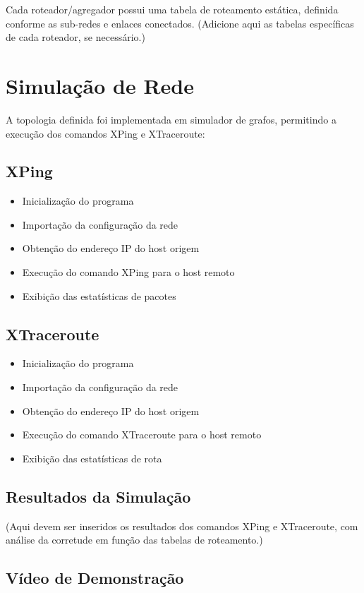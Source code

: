 \documentclass[conference,compsoc]{IEEEtran}
\begin{document}
\begin{otherlanguage}{brazil}
Cada roteador/agregador possui uma tabela de roteamento estática, definida conforme as sub-redes e enlaces conectados. (Adicione aqui as tabelas específicas de cada roteador, se necessário.)

\section{Simulação de Rede}

A topologia definida foi implementada em simulador de grafos, permitindo a execução dos comandos XPing e XTraceroute:

\subsection{XPing}
\begin{itemize}
    \item Inicialização do programa
    \item Importação da configuração da rede
    \item Obtenção do endereço IP do host origem
    \item Execução do comando XPing para o host remoto
    \item Exibição das estatísticas de pacotes
\end{itemize}

\subsection{XTraceroute}
\begin{itemize}
    \item Inicialização do programa
    \item Importação da configuração da rede
    \item Obtenção do endereço IP do host origem
    \item Execução do comando XTraceroute para o host remoto
    \item Exibição das estatísticas de rota
\end{itemize}

\subsection{Resultados da Simulação}

(Aqui devem ser inseridos os resultados dos comandos XPing e XTraceroute, com análise da corretude em função das tabelas de roteamento.)

\subsection{Vídeo de Demonstração}


\end{otherlanguage}
\end{document}
